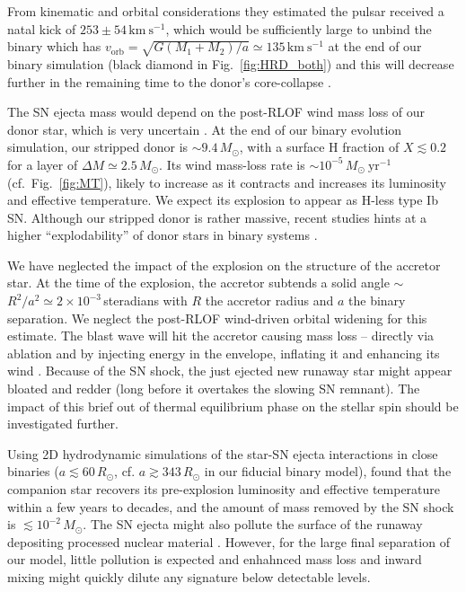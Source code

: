 \documentclass[twocolumn,twocolappendix,trackchanges]{aastex63}
\newcommand{\kms}{{\mathrm{km\ s^{-1}}}}
\DeclareRobustCommand{\Figref}[1]{Fig.~\ref{#1}}
\begin{document}
From kinematic and orbital considerations they estimated the pulsar
received a natal kick of
$253\pm54\,\kms$, which would be sufficiently large to unbind the
binary which has $v_\mathrm{orb}=\sqrt{G(M_1+M_2)/a}\simeq 135\,\kms$
at the end of our binary simulation (black diamond in \Figref{fig:HRD_both}) and this will decrease further in the
remaining time to the donor's core-collapse \citep{kalogera:96,
  tauris:15}.

The SN ejecta mass would depend on the post-RLOF wind mass loss of our
donor star, which is very uncertain \citep[e.g.,][]{renzo:17, vink:17,
  gilkis:19}.  At the end of our binary evolution simulation, our
stripped donor is
$\sim$$9.4\,M_\odot$, with a surface H fraction of
$X\lesssim0.2$ for a layer of $\Delta M \simeq
2.5\,M_\odot$.  Its wind mass-loss rate is $\sim10^{-5}\,M_\odot \
\mathrm{yr^{-1}}$ (cf.~\Figref{fig:MT}), likely to increase as it contracts and increases its luminosity and effective temperature. We expect its explosion to appear as H-less type Ib SN. Although our stripped donor is rather massive, recent studies hints at a higher ``explodability'' of donor stars in binary systems \citep[e.g.,][]{schneider:21, laplace:21, vartanyan:21}.

We have neglected the impact of the explosion on the structure of the accretor star. At the time of the explosion, the accretor subtends a solid angle
$\sim$$R^2/a^2\simeq 2\times10^{-3}$\,steradians with $R$ the accretor
radius and $a$ the binary separation. We neglect the post-RLOF
wind-driven orbital widening for this estimate.  The blast wave will
hit the accretor causing mass loss -- directly via ablation and by
injecting energy in the envelope, inflating it and enhancing its wind
\citep{wheeler:75, tauris:98, podsiadlowski:03, hirai:18}.  Because of
the SN shock, the just ejected new runaway star might appear bloated
and redder (long before it overtakes the slowing SN remnant). The
impact of this brief out of thermal equilibrium phase on the stellar
spin should be investigated further.

Using 2D hydrodynamic simulations of the star-SN ejecta interactions in close binaries ($a\lesssim
60\,R_\odot$, cf. $a\gtrsim
343\,R_\odot$ in our fiducial binary model), \cite{hirai:18} found that the companion star recovers its pre-explosion luminosity and effective temperature within a few years to decades, and the amount of mass removed by the SN shock is
$\lesssim10^{-2}\,M_\odot$.  The SN ejecta might also pollute the surface of the runaway depositing processed nuclear material \citep[e.g.,][]{przybilla:08, suda:21}. However, for the large final separation of our model, little pollution is expected and enhahnced mass loss and inward mixing might quickly dilute any signature below detectable levels.
\end{document}
